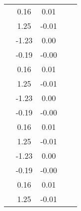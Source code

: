 \begin{table}
\begin{tabular}{c|cc|cc|}
\multicolumn{1}{|c|}{} & \multicolumn{1}{|c|}{      0.16} & \multicolumn{1}{|c|}{      0.01} & \multicolumn{1}{|c|}{} & \multicolumn{1}{|c|}{} \\ 
\multicolumn{1}{|c|}{} & \multicolumn{1}{|c|}{      1.25} & \multicolumn{1}{|c|}{     -0.01} & \multicolumn{1}{|c|}{} & \multicolumn{1}{|c|}{} \\ 
\multicolumn{1}{|c|}{} & \multicolumn{1}{|c|}{     -1.23} & \multicolumn{1}{|c|}{      0.00} & \multicolumn{1}{|c|}{} & \multicolumn{1}{|c|}{} \\ 
\multicolumn{1}{|c|}{} & \multicolumn{1}{|c|}{     -0.19} & \multicolumn{1}{|c|}{     -0.00} & \multicolumn{1}{|c|}{} & \multicolumn{1}{|c|}{} \\ 
\multicolumn{1}{|c|}{} & \multicolumn{1}{|c|}{      0.16} & \multicolumn{1}{|c|}{      0.01} & \multicolumn{1}{|c|}{} & \multicolumn{1}{|c|}{} \\ 
\multicolumn{1}{|c|}{} & \multicolumn{1}{|c|}{      1.25} & \multicolumn{1}{|c|}{     -0.01} & \multicolumn{1}{|c|}{} & \multicolumn{1}{|c|}{} \\ 
\multicolumn{1}{|c|}{} & \multicolumn{1}{|c|}{     -1.23} & \multicolumn{1}{|c|}{      0.00} & \multicolumn{1}{|c|}{} & \multicolumn{1}{|c|}{} \\ 
\multicolumn{1}{|c|}{} & \multicolumn{1}{|c|}{     -0.19} & \multicolumn{1}{|c|}{     -0.00} & \multicolumn{1}{|c|}{} & \multicolumn{1}{|c|}{} \\ 
\multicolumn{1}{|c|}{} & \multicolumn{1}{|c|}{      0.16} & \multicolumn{1}{|c|}{      0.01} & \multicolumn{1}{|c|}{} & \multicolumn{1}{|c|}{} \\ 
\multicolumn{1}{|c|}{} & \multicolumn{1}{|c|}{      1.25} & \multicolumn{1}{|c|}{     -0.01} & \multicolumn{1}{|c|}{} & \multicolumn{1}{|c|}{} \\ 
\multicolumn{1}{|c|}{} & \multicolumn{1}{|c|}{     -1.23} & \multicolumn{1}{|c|}{      0.00} & \multicolumn{1}{|c|}{} & \multicolumn{1}{|c|}{} \\ 
\multicolumn{1}{|c|}{} & \multicolumn{1}{|c|}{     -0.19} & \multicolumn{1}{|c|}{     -0.00} & \multicolumn{1}{|c|}{} & \multicolumn{1}{|c|}{} \\ 
\multicolumn{1}{|c|}{} & \multicolumn{1}{|c|}{      0.16} & \multicolumn{1}{|c|}{      0.01} & \multicolumn{1}{|c|}{} & \multicolumn{1}{|c|}{} \\ 
\multicolumn{1}{|c|}{} & \multicolumn{1}{|c|}{      1.25} & \multicolumn{1}{|c|}{     -0.01} & \multicolumn{1}{|c|}{} & \multicolumn{1}{|c|}{} \\ 

\end{tabular}
\end{table}
